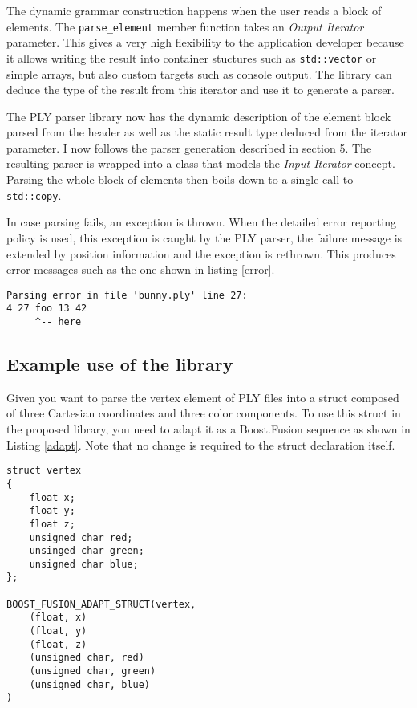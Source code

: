 The dynamic grammar construction happens when the user reads a block of
elements. The \texttt{parse\_element} member function takes an
\emph{Output Iterator} parameter. This gives a very high flexibility to the
application developer because it allows writing the result into container
stuctures such as \texttt{std::vector} or simple arrays, but also custom targets
such as console output. The library can deduce the type of the result from this
iterator and use it to generate a parser.

The PLY parser library now has the dynamic description of the element block
parsed from the header as well as the static result type deduced from the
iterator parameter. I now follows the parser generation described in section 5.
The resulting parser is wrapped into a class that models the
\emph{Input Iterator} concept. Parsing the whole block of elements then boils
down to a single call to \texttt{std::copy}.

In case parsing fails, an exception is thrown. When the detailed error reporting
policy is used, this exception is caught by the PLY parser, the failure message
is extended by position information and the exception is rethrown. This produces
error messages such as the one shown in listing \ref{error}.

\begin{lstlisting}[label=error,frame=tb,caption=detailed parsing error message]
Parsing error in file 'bunny.ply' line 27:
4 27 foo 13 42
     ^-- here
\end{lstlisting}


\subsection{Example use of the library}

Given you want to parse the vertex element of PLY files into a struct composed
of three Cartesian coordinates and three color components. To use this struct in
the proposed library, you need to adapt it as a Boost.Fusion sequence as shown
in Listing \ref{adapt}. Note that no change is required to the struct
declaration itself.

\begin{lstlisting}[label=adapt,frame=tb,caption=Adapting a vertex struct]
struct vertex
{
	float x;
	float y;
	float z;
	unsigned char red;
	unsinged char green;
	unsigned char blue;
};

BOOST_FUSION_ADAPT_STRUCT(vertex,
	(float, x)
	(float, y)
	(float, z)
	(unsigned char, red)
	(unsigned char, green)
	(unsigned char, blue)
)
\end{lstlisting}

